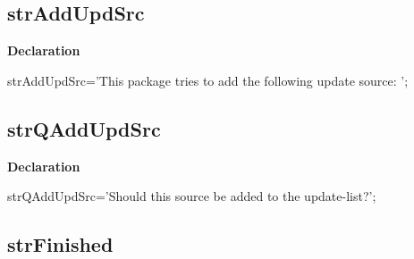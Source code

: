 \documentclass{report}
\newif\ifpdf
\begin{document}
\subsection*{strAddUpdSrc}
\fi
\label{trstrings-strAddUpdSrc}
\begin{list}{}{
\setlength{\itemindent}{0cm}
\setlength{\listparindent}{0cm}
\setlength{\leftmargin}{\evensidemargin}
\addtolength{\leftmargin}{\tmplength}
\settowidth{\labelsep}{X}
\addtolength{\leftmargin}{\labelsep}
\setlength{\labelwidth}{\tmplength}
}
\item[\textbf{Declaration}\hfill]
\ifpdf
\begin{flushleft}
\fi
\begin{ttfamily}
strAddUpdSrc='This package tries to add the following update source: ';\end{ttfamily}

\ifpdf
\end{flushleft}
\fi

\end{list}
\ifpdf
\subsection*{\large{\textbf{strQAddUpdSrc}}\normalsize\hspace{1ex}\hrulefill}
\else
\subsection*{strQAddUpdSrc}
\fi
\label{trstrings-strQAddUpdSrc}
\begin{list}{}{
\setlength{\itemindent}{0cm}
\setlength{\listparindent}{0cm}
\setlength{\leftmargin}{\evensidemargin}
\addtolength{\leftmargin}{\tmplength}
\settowidth{\labelsep}{X}
\addtolength{\leftmargin}{\labelsep}
\setlength{\labelwidth}{\tmplength}
}
\item[\textbf{Declaration}\hfill]
\ifpdf
\begin{flushleft}
\fi
\begin{ttfamily}
strQAddUpdSrc='Should this source be added to the update-list?';\end{ttfamily}

\ifpdf
\end{flushleft}
\fi

\end{list}
\ifpdf
\subsection*{\large{\textbf{strFinished}}\normalsize\hspace{1ex}\hrulefill}
\else
\end{document}
